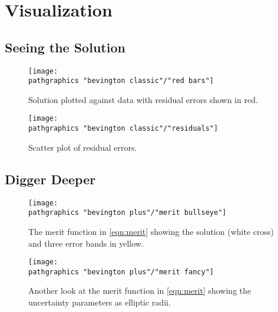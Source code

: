 \section{Visualization}  %

\subsection{Seeing the Solution}  %

\begin{figure}[htbp] %
   \centering
   \texttt{[image: \\pathgraphics "bevington classic"/"red bars"]} 
   \caption[Solution plotted against data with residual errors shown in red.]{Solution plotted against data with residual errors shown in red.}
   \label{fig:bevington soln v data}
\end{figure}

\begin{figure}[htbp] %
   \centering
   \texttt{[image: \\pathgraphics "bevington classic"/"residuals"]} 
   \caption[Scatter plot of residual errors.]{Scatter plot of residual errors.}
   \label{fig:bevington residuals}
\end{figure}

\subsection{Digger Deeper}  %

\begin{figure}[htbp] %
   \centering
   \texttt{[image: \\pathgraphics "bevington plus"/"merit bullseye"]} 
   \caption[The merit function.]{The merit function in \eqref{eqn:merit} showing the solution (white cross) and three error bands in yellow.}
   \label{fig:bevington merit function}
\end{figure}

\begin{figure}[htbp] %
   \centering
   \texttt{[image: \\pathgraphics "bevington plus"/"merit fancy"]} 
   \caption[Another look at the merit function.]{Another look at the merit function in  \eqref{eqn:merit} showing the uncertainty parameters as elliptic radii.}
\end{figure}

